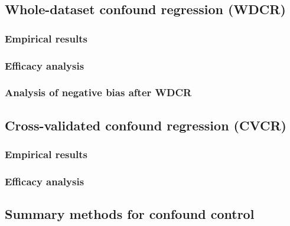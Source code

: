 \documentclass[12pt,american,a4paper,oneside,]{memoir} %
\begin{document}
\hypertarget{whole-dataset-confound-regression-wdcr}{%
\subsection{Whole-dataset confound regression (WDCR)}\label{whole-dataset-confound-regression-wdcr}}

\hypertarget{empirical-results-1}{%
\subsubsection{Empirical results}\label{empirical-results-1}}

\hypertarget{efficacy-analysis}{%
\subsubsection{Efficacy analysis}\label{efficacy-analysis}}

\hypertarget{confounds-decoding-results-wdcr-bias}{%
\subsubsection{Analysis of negative bias after WDCR}\label{confounds-decoding-results-wdcr-bias}}

\hypertarget{cross-validated-confound-regression-cvcr}{%
\subsection{Cross-validated confound regression (CVCR)}\label{cross-validated-confound-regression-cvcr}}

\hypertarget{empirical-results-2}{%
\subsubsection{Empirical results}\label{empirical-results-2}}

\hypertarget{efficacy-analysis-1}{%
\subsubsection{Efficacy analysis}\label{efficacy-analysis-1}}

\hypertarget{summary-methods-for-confound-control}{%
\subsection{Summary methods for confound control}\label{summary-methods-for-confound-control}}
\end{document}
